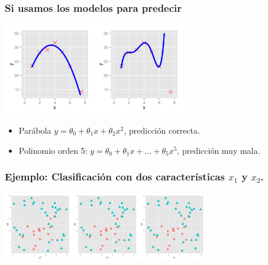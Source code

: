 \documentclass{beamer}
\begin{document}
   \begin{frame}\frametitle{Si usamos los modelos para predecir}
      \begin{overlayarea}{\textwidth}{8cm} 
 \begin{center}
   \includegraphics[height=4cm]{xyregularization-prediccion2151.png}
 \end{center}
     \begin{itemize}
 \item Parábola $y=\theta_0+\theta_1x+\theta_2x^2$, predicción correcta.
 \item Polinomio orden 5: $y=\theta_0+\theta_1x+\ldots+\theta_5x^5$, predicción muy mala.
 \end{itemize}

   \end{overlayarea}

 \end{frame}
    \begin{frame}\frametitle{Ejemplo: Clasificación con dos características $x_1$ y $x_2$.}
   \begin{overlayarea}{\textwidth}{8cm} 
 \begin{center}
   \includegraphics[height=3cm]{decisionboundaries-000.png}
 \end{center}
   \end{overlayarea}
   
 \end{frame}
\end{document}
